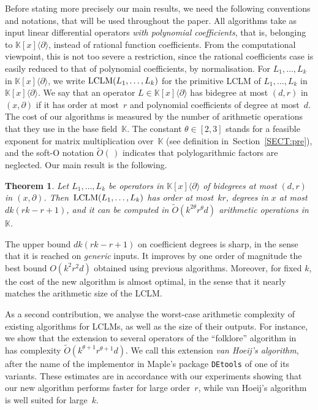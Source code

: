 \documentclass{sig-alt-full}
\def\K {\ensuremath{\mathbb{K}}}
\newcommand{\x}{x}
\newcommand{\Dx}{\partial}
\newcommand{\lclm} { {\rm LCLM}}
\newcommand{\bigOsoft}{\widetilde{{O}}}
\newtheorem{theorem}{Theorem}
\begin{document}
Before stating more precisely our main results, we need the following
conventions and notations, that will be used throughout the paper. All
algorithms take as input linear differential operators \emph{with
polynomial coefficients}, that is, belonging to $\K[x]\langle \Dx\rangle$,
instead of rational function coefficients. From the computational viewpoint,
this is not too severe a restriction, since the rational coefficients case 
is easily reduced to that of polynomial coefficients, by normalisation. For
$L_1,\ldots,L_k$ in $\K[x]\langle \Dx\rangle$, we write
$\lclm(L_1,\ldots,L_k)$ 
for the primitive LCLM of $L_1,\ldots,L_k$ in  $\K[\x]\langle \Dx\rangle$.
We say that an operator $L\in \K[x]\langle \Dx\rangle$ has bidegree at most
$(d,r)$ in $(x,\partial)$ if it has order at most~$r$ and polynomial
coefficients of degree at most~$d$.
The cost of our algorithms is measured by the number of
arithmetic operations that they use in the base field~$\K$. The constant
$\theta \in [2,3]$ stands for a feasible exponent for matrix multiplication
over~$\K$ (see definition in~Section~\ref{SECT:pre}), and the soft-O notation $\bigOsoft(\,)$ indicates that
polylogarithmic factors are neglected. 
Our main result is the following.
\begin{theorem} \label{th:main}
	Let $L_1, \ldots, L_k$ be  operators in $\K[x]\langle
\Dx\rangle$
of bidegrees at most $(d,r)$ in $(x,\partial)$.
Then~$\lclm(L_1,\ldots,L_k)$ has order at most~$kr$, degrees in
$x$ at most~$dk(rk-r+1)$, and it can be computed in $\bigOsoft(k^{2\theta}
r^\theta d)$ arithmetic operations in~$\K$. 
\end{theorem}

The upper bound $dk(rk-r+1)$ on coefficient degrees is sharp, in the sense that it is reached on \emph{generic\/} inputs. 
It improves by one order of magnitude the best bound $O(k^2r^2d)$ obtained using
previous algorithms. Moreover, for fixed $k$, the cost of the new
algorithm is almost optimal, in the sense that it nearly matches the
arithmetic size of the LCLM. 

As a second contribution, we analyse the worst-case arithmetic complexity of
existing algorithms for LCLMs, as well as the size of their outputs. For
instance, we show that the extension to several operators 
of the ``folklore'' algorithm
in~\cite{Stanley80,SaZi94}  has complexity
$\bigOsoft(k^{\theta+1}r^{\theta+1}d)$. We call this extension \emph{van
Hoeij's algorithm}, after the name of the implementor in Maple's package
\verb+DEtools+ of one of its variants. These estimates are in accordance with our experiments showing
that our new algorithm performs faster for large order~$r$, while van Hoeij's
algorithm is well suited for large~$k$. 
\end{document}
